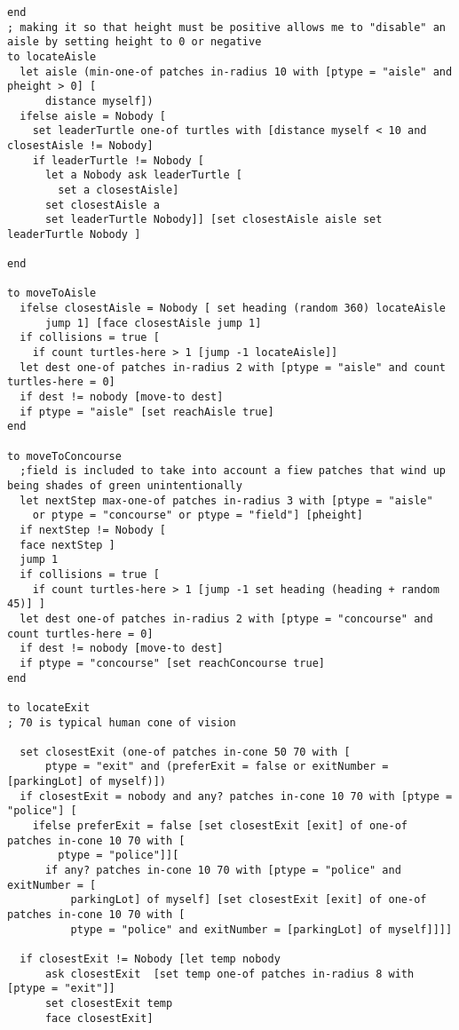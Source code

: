 \documentclass{article}
\begin{document}
\begin{lstlisting}
end
; making it so that height must be positive allows me to "disable" an aisle by setting height to 0 or negative
to locateAisle
  let aisle (min-one-of patches in-radius 10 with [ptype = "aisle" and pheight > 0] [
      distance myself])
  ifelse aisle = Nobody [ 
    set leaderTurtle one-of turtles with [distance myself < 10 and closestAisle != Nobody] 
    if leaderTurtle != Nobody [
      let a Nobody ask leaderTurtle [
        set a closestAisle] 
      set closestAisle a  
      set leaderTurtle Nobody]] [set closestAisle aisle set leaderTurtle Nobody ] 
  
end

to moveToAisle
  ifelse closestAisle = Nobody [ set heading (random 360) locateAisle
      jump 1] [face closestAisle jump 1]
  if collisions = true [
    if count turtles-here > 1 [jump -1 locateAisle]]
  let dest one-of patches in-radius 2 with [ptype = "aisle" and count turtles-here = 0]
  if dest != nobody [move-to dest]    
  if ptype = "aisle" [set reachAisle true]
end

to moveToConcourse
  ;field is included to take into account a fiew patches that wind up being shades of green unintentionally
  let nextStep max-one-of patches in-radius 3 with [ptype = "aisle" 
    or ptype = "concourse" or ptype = "field"] [pheight] 
  if nextStep != Nobody [
  face nextStep ]
  jump 1
  if collisions = true [
    if count turtles-here > 1 [jump -1 set heading (heading + random 45)] ]
  let dest one-of patches in-radius 2 with [ptype = "concourse" and count turtles-here = 0]
  if dest != nobody [move-to dest]
  if ptype = "concourse" [set reachConcourse true]
end

to locateExit
; 70 is typical human cone of vision

  set closestExit (one-of patches in-cone 50 70 with [
      ptype = "exit" and (preferExit = false or exitNumber = [parkingLot] of myself)])
  if closestExit = nobody and any? patches in-cone 10 70 with [ptype = "police"] [
    ifelse preferExit = false [set closestExit [exit] of one-of patches in-cone 10 70 with [
        ptype = "police"]][
      if any? patches in-cone 10 70 with [ptype = "police" and exitNumber = [
          parkingLot] of myself] [set closestExit [exit] of one-of patches in-cone 10 70 with [
          ptype = "police" and exitNumber = [parkingLot] of myself]]]]
  
  if closestExit != Nobody [let temp nobody
      ask closestExit  [set temp one-of patches in-radius 8 with [ptype = "exit"]]
      set closestExit temp 
      face closestExit]  
      

\end{lstlisting}
\end{document}
